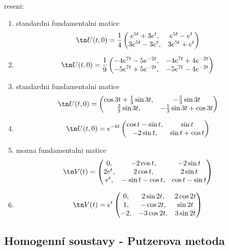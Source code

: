 \pagebreak
reseni:
\begin{enumerate}
\item standardni fundamentalni matice
\[
  \tn U(t,0)=\frac14\left(\begin{matrix}
                     e^{5t}+3e^t,&e^{5t}-e^t\\
                     3e^{5t}-3e^t,&3e^{5t}+e^t
                     \end{matrix}\right)
\]
\item
\[
  \tn U(t,0)=\frac19\left(\begin{matrix}
                     -4e^{7t}-5e^{-2t},& -4e^{7t}+4e^{-2t}\\
                     -5e^{7t}+5e^{-2t},&-5e^{7t}-4e^{-2t}
                     \end{matrix}\right)
\]
\item
standardni fundamentalni matice
\[
  \tn U(t,0)=\left(\begin{matrix}
                     \cos3t+\frac13\sin3t,&-\frac53\sin3t\\
                     \frac23\sin3t,&-\frac13\sin3t+\cos3t
                   \end{matrix}\right)
\]
\item
\[
  \tn U(t,0)=e^{-6t}\left(\begin{matrix}
                     \cos t-\sin t,&\sin t\\
                     -2\sin t,&\sin t+\cos t
                   \end{matrix}\right)
\]
\item mozna fundamentalni matice
\[
  \tn V(t)=\left(\begin{matrix}
               0,&-2\cos t,&-2\sin t\\
               2e^t,&2\cos t,&2\sin t\\
               e^t,&-\sin t-\cos t,& \cos t -\sin t
             \end{matrix}\right)
\]
\item
\[
  \tn V(t)=e^t\left(\begin{matrix}
               0,&2\sin 2t,& 2\cos2t\\
               1,&-\cos2t,&\sin2t\\
               -2,&-3\cos2t,&3\sin2t
             \end{matrix}\right)
\]
\end{enumerate}
\subsection{Homogenní soustavy - Putzerova metoda}

